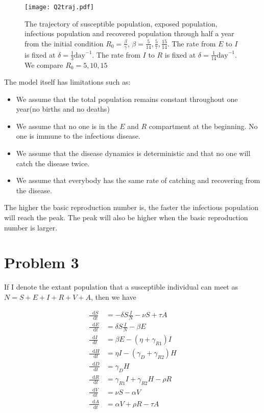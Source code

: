 \documentclass[12pt]{article}
\newcommand*\diff{\mathop{}\!\mathrm{d}}
\begin{document}
\begin{figure}[htbp]
	\centering
	\texttt{[image: Q2traj.pdf]}
	\caption{The trajectory of susceptible population, exposed population, infectious population and recovered population through half a year from the initial condition $R_{0} = \frac{\beta}{\gamma}$, $\beta = \frac{5}{14}, \frac{5}{7}, \frac{15}{14}$. The rate from $E$ to $I$ is fixed at $\delta=\frac{1}{3} \text{day}^{-1}$. The rate from $I$ to $R$ is fixed at $\delta=\frac{1}{14} \text{day}^{-1}$. We compare $R_0=5, 10, 15$}\label{Q2traj}
\end{figure}

The model itself has limitations such as:
\begin{itemize}
	\item We assume that the total population remains constant throughout one year(no births and no deaths)
	\item We assume that no one is in the $E$ and $R$ compartment at the beginning. No one is immune to the infectious disease.
	\item We assume that the disease dynamics is deterministic and that no one will catch the disease twice.
	\item We assume that everybody has the same rate of catching and recovering from the disease.
\end{itemize}

The higher the basic reproduction number is, the faster the infectious population will reach the peak. The peak will also be higher when the basic reproduction number is larger.

\section*{Problem 3}

If I denote the extant population that a susceptible individual can meet as $N = S+E+I+R+V+A$, then we have

\begin{align*}
	\frac{\diff S}{\diff t} &= -\delta S \frac{I}{N} - \nu S + \tau A\\
	\frac{\diff E}{\diff t} &= \delta S \frac{I}{N} - \beta E\\
	\frac{\diff I}{\diff t} &= \beta E - (\eta + \gamma_{R1})I \\
	\frac{\diff H}{\diff t} &= \eta I-(\gamma_{D}+\gamma_{R2})H \\
	\frac{\diff D}{\diff t} &= \gamma_{D} H\\
	\frac{\diff R}{\diff t} &= \gamma_{R1} I + \gamma_{R2} H - \rho R\\
	\frac{\diff V}{\diff t} &= \nu S - \alpha V\\
	\frac{\diff A}{\diff t} &= \alpha V+\rho R - \tau A
\end{align*}
\end{document}
